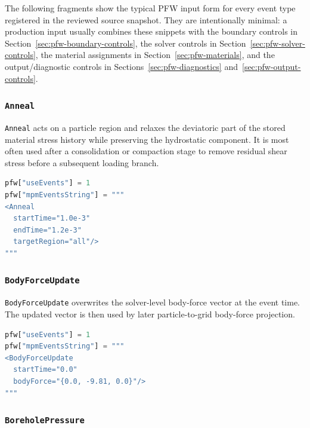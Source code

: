 The following fragments show the typical PFW input form for every event type registered in the reviewed source snapshot.  They are intentionally minimal: a production input usually combines these snippets with the boundary controls in Section~\ref{sec:pfw-boundary-controls}, the solver controls in Section~\ref{sec:pfw-solver-controls}, the material assignments in Section~\ref{sec:pfw-materials}, and the output/diagnostic controls in Sections~\ref{sec:pfw-diagnostics} and~\ref{sec:pfw-output-controls}.

\subsubsection{\texttt{Anneal}}

\texttt{Anneal} acts on a particle region and relaxes the deviatoric part of the stored material stress history while preserving the hydrostatic component.  It is most often used after a consolidation or compaction stage to remove residual shear stress before a subsequent loading branch.

\begin{lstlisting}[language=Python,caption={Anneal event.}]
pfw["useEvents"] = 1
pfw["mpmEventsString"] = """
<Anneal
  startTime="1.0e-3"
  endTime="1.2e-3"
  targetRegion="all"/>
"""
\end{lstlisting}

\subsubsection{\texttt{BodyForceUpdate}}

\texttt{BodyForceUpdate} overwrites the solver-level body-force vector at the event time.  The updated vector is then used by later particle-to-grid body-force projection.

\begin{lstlisting}[language=Python,caption={Body-force update event.}]
pfw["useEvents"] = 1
pfw["mpmEventsString"] = """
<BodyForceUpdate
  startTime="0.0"
  bodyForce="{0.0, -9.81, 0.0}"/>
"""
\end{lstlisting}

\subsubsection{\texttt{BoreholePressure}}

